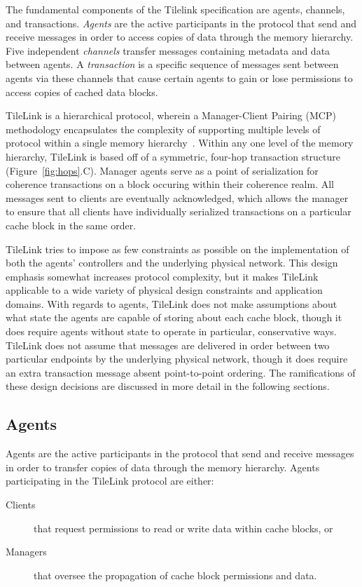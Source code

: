 The fundamental components of the Tilelink specification are agents, channels, and transactions.
{\em Agents} are the active participants in the protocol that send and receive messages in order to access copies of data through the memory hierarchy.
Five independent {\em channels} transfer messages containing metadata and data between agents.
A {\em transaction} is a specific sequence of messages sent between agents via these channels
that cause certain agents to gain or lose permissions to access copies of cached data blocks.

TileLink is a hierarchical protocol, wherein a Manager-Client Pairing (MCP) methodology encapsulates the complexity of supporting
multiple levels of protocol within a single memory hierarchy~\cite{beu2011manager}.
Within any one level of the memory hierarchy, TileLink is based off of a symmetric, four-hop transaction structure (Figure~\ref{fig:hops}.C).
Manager agents serve as a point of serialization for coherence transactions on a block occuring within their coherence realm.
All messages sent to clients are eventually acknowledged, which allows the manager to ensure that all clients have
individually serialized transactions on a particular cache block in the same order.

TileLink tries to impose as few constraints as possible on the implementation of both the agents' controllers and the underlying physical network.
This design emphasis somewhat increases protocol complexity, but it makes TileLink applicable to a wide variety of physical design constraints and application domains.
With regards to agents, TileLink does not make assumptions about what state the agents are capable of storing about each cache block,
though it does require agents without state to operate in particular, conservative ways.
TileLink does not assume that messages are delivered in order between two particular endpoints by the underlying physical network,
though it does require an extra transaction message absent point-to-point ordering.
The ramifications of these design decisions are discussed in more detail in the following sections.

\subsection{Agents}

Agents are the active participants in the protocol that send and receive messages in order to transfer copies of data through the memory hierarchy.
Agents participating in the TileLink protocol are either:
\begin{description}
\item[Clients] that request permissions to read or write data within cache blocks, or
\item[Managers] that oversee the propagation of cache block permissions and data.
\end{description}

